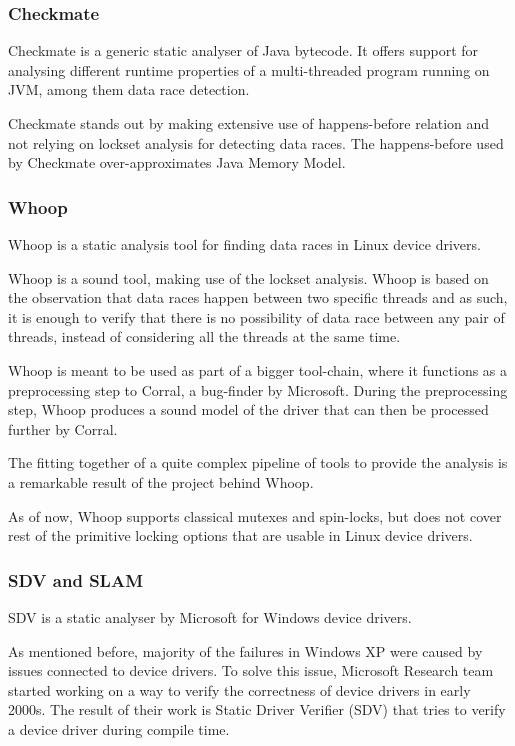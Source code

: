 \documentclass[..thesis.tex]{subfiles}
\begin{document}
\subsubsection{Checkmate}

Checkmate\cite{ferrara_checkmate_2009} is a generic static analyser of Java bytecode.
It offers support for analysing different runtime properties of a multi-threaded program running on JVM, among them data race detection.

Checkmate stands out by making extensive use of happens-before relation and not relying on lockset analysis for detecting data races.
The happens-before used by Checkmate over-approximates Java Memory Model.

\subsubsection{Whoop}

Whoop\cite{deligiannis_fast_2015} is a static analysis tool for finding data races in Linux device drivers. 

Whoop is a sound tool, making use of the lockset analysis. Whoop is based on the observation that data races happen between two specific threads and as such,
it is enough to verify that there is no possibility of data race between any pair of threads, instead of considering all the threads at the same time.

Whoop is meant to be used as part of a bigger tool-chain, where it functions as a preprocessing step to Corral, a bug-finder by Microsoft. During the preprocessing step,
Whoop produces a sound model of the driver that can then be processed further by Corral.

The fitting together of a quite complex pipeline of tools to provide the analysis is a remarkable result of the project behind Whoop.

As of now, Whoop supports classical mutexes and spin-locks, but does not cover rest of the primitive locking options that are usable in Linux device drivers. 

\subsubsection{SDV and SLAM}

SDV is a static analyser by Microsoft for Windows device drivers.

As mentioned before, majority of the failures in Windows XP were caused by issues connected to device drivers. To solve this issue,
Microsoft Research team started working on a way to verify the correctness of device drivers in early 2000s.
The result of their work is Static Driver Verifier (SDV) that tries to verify a device driver during compile time. 
\end{document}
